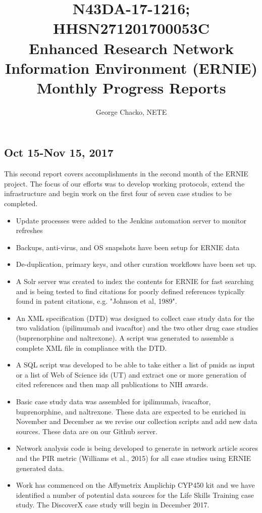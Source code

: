 \documentclass[11pt, oneside]{article}   	%
\title{N43DA-17-1216; HHSN271201700053C \\
Enhanced Research Network Information Environment (ERNIE)\\
Monthly Progress Reports}
\author{George Chacko, NETE}
\date{}							%
\begin{document}
\maketitle
\subsection*{Oct 15-Nov 15, 2017}

This second report covers accomplishments in the second month of the ERNIE project. The focus of our efforts was to develop working protocols, extend the infrastructure and begin work on the first four of seven case studies to be completed.

\begin{itemize}
\item Update processes were added to the Jenkins automation server to monitor refreshes
\item Backups, anti-virus, and OS snapshots have been setup for ERNIE data
\item De-duplication, primary keys, and other curation workflows have been set up.
\item A Solr server was created to index the contents for ERNIE for fast searching and is being tested to find citations for poorly defined references typically found in patent citations, e.g. "Johnson et al, 1989".
\item An XML specification (DTD) was designed to collect case study data for the two validation (ipilimumab and ivacaftor) and the two other drug case studies (buprenorphine and naltrexone). A script was generated to assemble a complete XML file in compliance with the DTD.
\item A SQL script was developed to be able to take either a list of pmids as input or a list of Web of Science ids (UT) and extract one or more generation of cited references and then map all publications to NIH awards.
\item Basic case study data was assembled for ipilimumab, ivacaftor, buprenorphine, and naltrexone. These data are expected to be enriched in November and December as we revise our collection scripts and add new data sources. These data are on our Github server.
\item Network analysis code is being developed to generate in network article scores and the PIR metric (Williams et al., 2015) for all case studies using ERNIE generated data.
\item Work has commenced on the Affymetrix Amplichip CYP450 kit and we have identified a number of potential data sources for the Life Skills Training case study. The DiscoverX case study will begin in December 2017.
\end{itemize}
\end{document}
